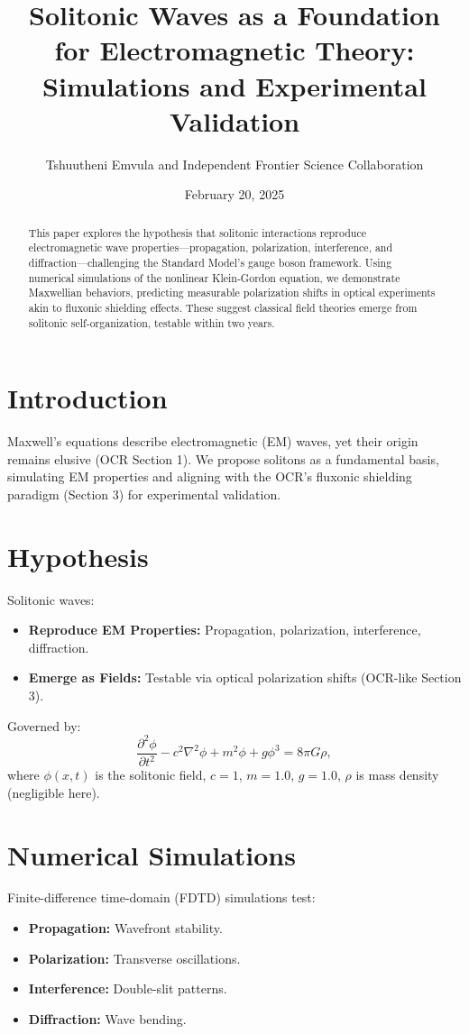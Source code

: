 \documentclass{article}
\title{Solitonic Waves as a Foundation for Electromagnetic Theory: Simulations and Experimental Validation}
\author{Tshuutheni Emvula and Independent Frontier Science Collaboration}
\date{February 20, 2025}
\begin{document}
\maketitle

\begin{abstract}
This paper explores the hypothesis that solitonic interactions reproduce electromagnetic wave properties—propagation, polarization, interference, and diffraction—challenging the Standard Model’s gauge boson framework. Using numerical simulations of the nonlinear Klein-Gordon equation, we demonstrate Maxwellian behaviors, predicting measurable polarization shifts in optical experiments akin to fluxonic shielding effects. These suggest classical field theories emerge from solitonic self-organization, testable within two years.
\end{abstract}

\section{Introduction}
Maxwell’s equations describe electromagnetic (EM) waves, yet their origin remains elusive (OCR Section 1). We propose solitons as a fundamental basis, simulating EM properties and aligning with the OCR’s fluxonic shielding paradigm (Section 3) for experimental validation.

\section{Hypothesis}
Solitonic waves:
\begin{itemize}
    \item \textbf{Reproduce EM Properties:} Propagation, polarization, interference, diffraction.
    \item \textbf{Emerge as Fields:} Testable via optical polarization shifts (OCR-like Section 3).
\end{itemize}
Governed by:
\begin{equation}
\frac{\partial^2 \phi}{\partial t^2} - c^2 \nabla^2 \phi + m^2 \phi + g \phi^3 = 8 \pi G \rho,
\end{equation}
where \(\phi(x,t)\) is the solitonic field, \(c = 1\), \(m = 1.0\), \(g = 1.0\), \(\rho\) is mass density (negligible here).

\section{Numerical Simulations}
Finite-difference time-domain (FDTD) simulations test:
\begin{itemize}
    \item \textbf{Propagation:} Wavefront stability.
    \item \textbf{Polarization:} Transverse oscillations.
    \item \textbf{Interference:} Double-slit patterns.
    \item \textbf{Diffraction:} Wave bending.
\end{itemize}
\end{document}
